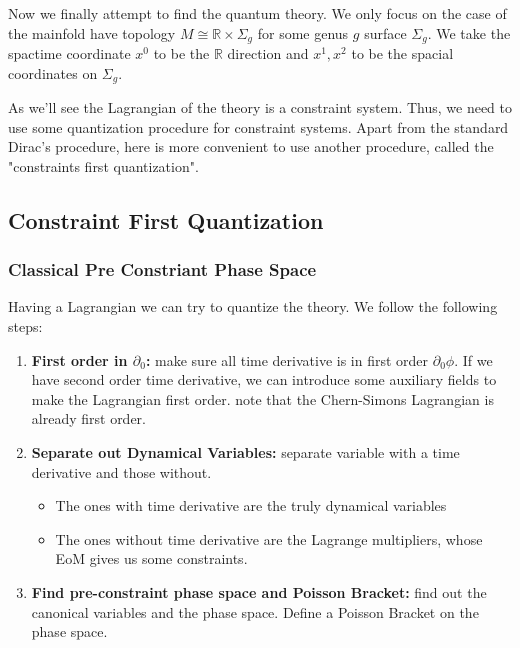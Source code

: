 Now we finally attempt to find the quantum theory. We only focus on
the case of the mainfold have topology $ M \cong \mathbb{R} \times
\Sigma_g $ for some genus $ g $ surface $ \Sigma_g $. We take the
spactime coordinate $ x^0 $ to be the $ \mathbb{R} $ direction and $
x^1, x^2 $ to be the spacial coordinates on $ \Sigma_g $.

As we'll see the
Lagrangian of the theory is a constraint system. Thus, we need to use
some quantization procedure for constraint systems. Apart from the
standard Dirac's procedure, here is more convenient to use another
procedure, called the "constraints first quantization".

\subsection{Constraint First Quantization}

\subsubsection{Classical Pre Constriant Phase Space}

Having a Lagrangian we can try to quantize the theory. We follow the
following steps:
\begin{enumerate}
  \item \textbf{First order in $ \partial_{0} $: } make sure all time
    derivative is in first order $
    \partial_{0} \phi $. If we have second order time derivative, we
    can introduce some auxiliary fields to make the Lagrangian first
    order. note that the Chern-Simons Lagrangian is already first order.
  \item \textbf{Separate out Dynamical Variables: } separate variable
    with a time derivative and those without.
    \begin{itemize}
      \item The ones with time derivative are the truly dynamical variables
      \item The ones without time derivative are the Lagrange
        multipliers, whose EoM gives us some constraints.
    \end{itemize}
  \item \textbf{Find pre-constraint phase space and Poisson Bracket:
    } find out the canonical variables and the phase space. Define a
    Poisson Bracket on the phase space.
\end{enumerate}

